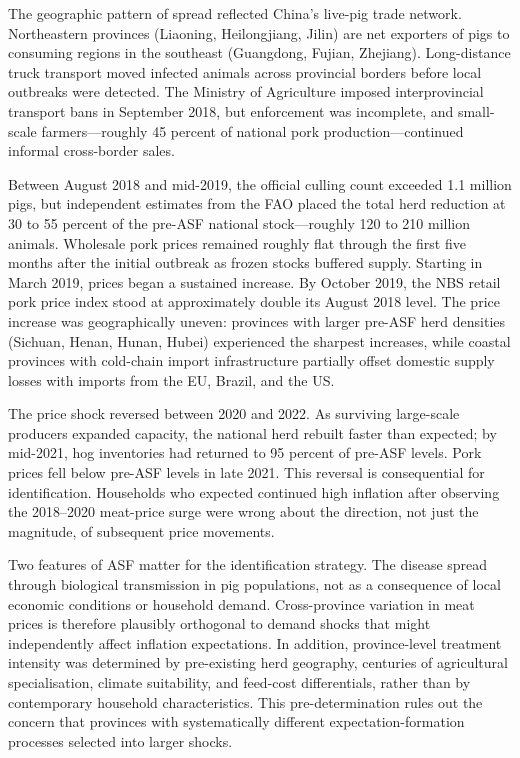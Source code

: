 The geographic pattern of spread reflected China's live-pig
trade network.
Northeastern provinces (Liaoning, Heilongjiang, Jilin) are
net exporters of pigs to consuming regions in the southeast
(Guangdong, Fujian, Zhejiang).
Long-distance truck transport moved infected animals across
provincial borders before local outbreaks were detected.
The Ministry of Agriculture imposed interprovincial transport
bans in September 2018, but enforcement was incomplete, and
small-scale farmers---roughly 45 percent of national pork
production---continued informal cross-border sales.

Between August 2018 and mid-2019, the official culling count
exceeded 1.1 million pigs, but independent estimates from
the FAO placed the total herd reduction at 30 to 55 percent
of the pre-ASF national stock---roughly 120 to 210 million
animals.
Wholesale pork prices remained roughly flat through the first
five months after the initial outbreak as frozen stocks buffered
supply.
Starting in March 2019, prices began a sustained increase.
By October 2019, the NBS retail pork price index stood at
approximately double its August 2018 level.
The price increase was geographically uneven: provinces with
larger pre-ASF herd densities (Sichuan, Henan, Hunan, Hubei)
experienced the sharpest increases, while coastal provinces
with cold-chain import infrastructure partially offset
domestic supply losses with imports from the EU, Brazil,
and the US.

The price shock reversed between 2020 and 2022.
As surviving large-scale producers expanded capacity, the
national herd rebuilt faster than expected; by mid-2021, hog
inventories had returned to 95 percent of pre-ASF levels.
Pork prices fell below pre-ASF levels in late 2021.
This reversal is consequential for identification.
Households who expected continued high inflation after
observing the 2018--2020 meat-price surge were wrong about
the direction, not just the magnitude, of subsequent price
movements.

Two features of ASF matter for the identification strategy.
The disease spread through biological transmission in pig
populations, not as a consequence of local economic conditions
or household demand.
Cross-province variation in meat prices is therefore plausibly
orthogonal to demand shocks that might independently affect
inflation expectations.
In addition, province-level treatment intensity was determined
by pre-existing herd geography, centuries of agricultural
specialisation, climate suitability, and feed-cost
differentials, rather than by contemporary household
characteristics.
This pre-determination rules out the concern that provinces
with systematically different expectation-formation processes
selected into larger shocks.


